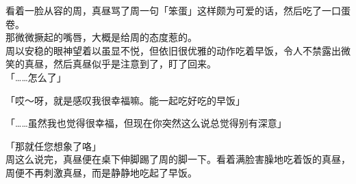 看着一脸从容的周，真昼骂了周一句「笨蛋」这样颇为可爱的话，然后吃了一口蛋卷。\\

那微微撅起的嘴唇，大概是给周的态度惹的。\\

周以安稳的眼神望着以虽显不悦，但依旧很优雅的动作吃着早饭，令人不禁露出微笑的真昼，然后真昼似乎是注意到了，盯了回来。\\

「……怎么了」

「哎～呀，就是感叹我很幸福嘛。能一起吃好吃的早饭」

「……虽然我也觉得很幸福，但现在你突然这么说总觉得别有深意」

「那就任您想象了咯」\\

周这么说完，真昼便在桌下伸脚踢了周的脚一下。看着满脸害臊地吃着饭的真昼，周便不再刺激真昼，而是静静地吃起了早饭。
